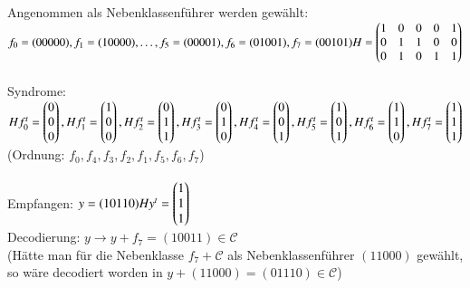Angenommen als Nebenklassenf\"uhrer werden gew\"ahlt:\\
$ f_0=(00000), f_1=(10000), \ldots, f_5=(00001), f_6=(01001), f_7=(00101) \\
\\
H =
\begin{pmatrix}
1 & 0 & 0 & 0 & 1\\
0 & 1 & 1 & 0 & 0\\
0 & 1 & 0 & 1 & 1\\
\end{pmatrix}$\\
\\
Syndrome:\\
$Hf^t_0=\begin{pmatrix}0 \\ 0 \\ 0 \end{pmatrix},
Hf^t_1=\begin{pmatrix}1 \\ 0 \\ 0 \end{pmatrix},
Hf^t_2=\begin{pmatrix}0 \\ 1 \\ 1 \end{pmatrix},
Hf^t_3=\begin{pmatrix}0 \\ 1 \\ 0 \end{pmatrix},
Hf^t_4=\begin{pmatrix}0 \\ 0 \\ 1 \end{pmatrix},\\
Hf^t_5=\begin{pmatrix}1 \\ 0 \\ 1 \end{pmatrix},
Hf^t_6=\begin{pmatrix}1 \\ 1 \\ 0 \end{pmatrix},
Hf^t_7=\begin{pmatrix}1 \\ 1 \\ 1 \end{pmatrix}$\\
(Ordnung: $f_0, f_4, f_3, f_2, f_1, f_5, f_6, f_7$)\\
\\
Empfangen: $y=(10110) \\
Hy^t=\begin{pmatrix} 1 \\ 1 \\ 1 \end{pmatrix}$ \\
Decodierung: $y \rightarrow y + f_7 = (10011) \in \mathcal{C}$\\
(H\"atte man f\"ur die Nebenklasse $f_7 + \mathcal{C}$ als Nebenklassenf\"uhrer $(11000)$ gew\"ahlt, so w\"are decodiert worden in $y + (11000) = (01110) \in \mathcal{C}$)

